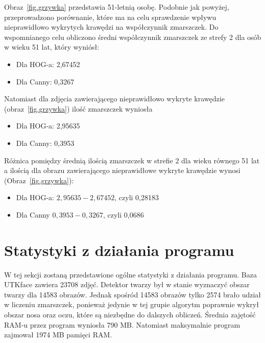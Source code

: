 \documentclass[a4paper,twoside,12pt]{book}
\begin{document}
    Obraz~\ref{fig.grzywka} przedstawia 51-letnią osobę. Podobnie jak powyżej, przeprowadzono porównanie,
    które ma na celu sprawdzenie wpływu nieprawidłowo wykrytych krawędzi na współczynnik zmarszczek.
    Do wspomnianego celu obliczono średni współczynnik zmarszczek ze strefy 2 dla osób w wieku 51 lat, który wyniósł:

    \begin{itemize}
        \item Dla HOG-a: 2,67452
        \item Dla Canny: 0,3267
    \end{itemize}

    Natomiast dla zdjęcia zawierającego nieprawidłowo wykryte krawędzie (obraz~\ref{fig.grzywka}) ilość zmarszczek
    wyniosła
    \begin{itemize}
        \item Dla HOG-a: 2,95635
        \item Dla Canny: 0,3953
    \end{itemize}

    Różnica pomiędzy średnią ilością zmarszczek w strefie 2 dla wieku równego 51 lat
    a ilością dla obrazu zawierającego nieprawidłowe wykryte krawędzie wynosi (Obraz~\ref{fig.grzywka}):
    \begin{itemize}
        \item Dla HOG-a: $2,95635-2,67452$, czyli 0,28183
        \item Dla Canny $0,3953-0,3267$, czyli 0,0686
    \end{itemize}


    \section{Statystyki z działania programu}\label{sec:statystyki-z-działania-programu}
    W tej sekcji zostaną przedstawione ogólne statystyki z działania programu.
    Baza UTKface zawiera 23708 zdjęć. Detektor twarzy był w stanie wyznaczyć obszar twarzy dla 14583 obrazów.
    Jednak spośród 14583 obrazów tylko 2574 brało udział w liczeniu zmarszczek, ponieważ jedynie w tej grupie algorytm
    poprawnie wykrył
    obszar nosa oraz oczu, które są niezbędne do dalszych obliczeń.
    Średnia zajętość RAM-u przez program wyniosła 790 MB.
    Natomiast maksymalnie program zajmował 1974 MB pamięci RAM.
\end{document}
